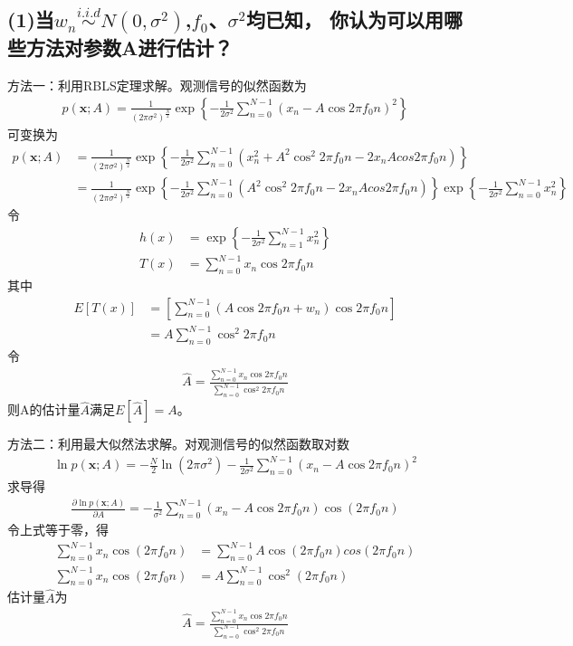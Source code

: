 \documentclass[fontset=windows]{article}
\numberwithin{figure}{section}
\begin{document}
\subsection*{(1)当\(w_n\overset{i.i.d}{\sim} N(0,\sigma^2)\),\(f_0\)、\(\sigma^2\)均已知，
	你认为可以用哪些方法对参数A进行估计？}

方法一：利用RBLS定理求解。观测信号的似然函数为
\begin{align*}
	p(\mathbf{x};A)=\frac{1}{(2\pi \sigma ^2)^{\frac{N}{2}}}\exp\left\{ -\frac{1}{2\sigma^2}
	\sum_{n=0}^{N-1}(x_n-A\cos2\pi f_0 n)^2	\right\}
\end{align*}
可变换为
\begin{align*}
	p(\mathbf{x};A) & =\frac{1}{(2\pi \sigma^2)^{\frac{N}{2}}}\exp\left\{-\frac{1}{2\sigma^2}
	\sum_{n=0}^{N-1}(x_n^2 +A^2\cos^2 2\pi f_0 n-2x_n A cos 2\pi f_0 n)\right\}               \\
	                & =\frac{1}{(2\pi \sigma^2)^{\frac{N}{2}}}\exp\left\{-\frac{1}{2\sigma^2}
	\sum_{n=0}^{N-1}(A^2\cos^2 2\pi f_0 n-2x_n A cos 2\pi f_0 n)\right\}
	\exp\left\{-\frac{1}{2\sigma^2}\sum_{n=0}^{N-1}x_n^2\right\}
\end{align*}
令
\begin{align*}
	h(x) & =\exp\left\{-\frac{1}{2\sigma^2}\sum_{n=1}^{N-1}x_n^2\right\} \\
	T(x) & =\sum_{n=0}^{N-1}x_n \cos 2\pi f_0 n
\end{align*}
其中
\begin{align*}
	E[T(x)] & =\left[\sum_{n=0}^{N-1}(A\cos 2\pi f_0 n+w_n)\cos 2\pi f_0 n \right] \\
	        & =A\sum_{n=0}^{N-1}\cos^2 2\pi f_0 n
\end{align*}
令
\begin{align*}
	\hat{A}=\frac{\sum_{n=0}^{N-1}x_n \cos 2\pi f_0 n}{\sum_{n=0}^{N-1}\cos^2 2\pi f_0 n}
\end{align*}
则A的估计量\(\hat{A}\)满足\(E[\hat{A}]=A\)。

方法二：利用最大似然法求解。对观测信号的似然函数取对数
\begin{align*}
	\ln p(\mathbf{x};A)=-\frac{N}{2}\ln (2\pi \sigma^2)-
	\frac{1}{2\sigma^2}\sum_{n=0}^{N-1}(x_n-A\cos 2\pi f_0 n)^2
\end{align*}
求导得
\begin{align*}
	\frac{\partial\ln p(\mathbf{x};A)}{\partial A}=-\frac{1}{\sigma^2}
	\sum_{n=0}^{N-1}(x_n-A\cos2\pi f_0 n)\cos(2\pi f_0 n)
\end{align*}
令上式等于零，得
\begin{align*}
	\sum_{n=0}^{N-1}x_n\cos(2\pi f_0 n) & =\sum_{n=0}^{N-1}A\cos(2\pi f_0 n)cos(2\pi f_0 n) \\
	\sum_{n=0}^{N-1}x_n\cos(2\pi f_0 n) & =A\sum_{n=0}^{N-1}\cos^2(2\pi f_0 n)
\end{align*}
估计量\(\hat{A}\)为
\begin{align*}
	\hat{A}=\frac{\sum_{n=0}^{N-1}x_n \cos 2\pi f_0 n}{\sum_{n=0}^{N-1}\cos^2 2\pi f_0 n}
\end{align*}
\end{document}
